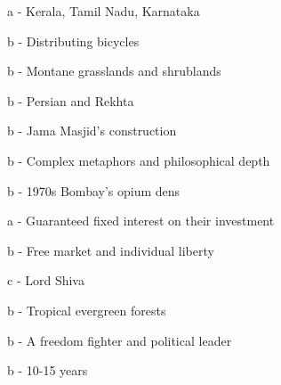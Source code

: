 \documentclass[12pt,a4paper]{book}
\begin{document}
\begin{enhancedmcq}[Question 2]{a - Kerala, Tamil Nadu, Karnataka}
\end{enhancedmcq}

\begin{enhancedmcq}[Question 3]{b - Distributing bicycles}
\end{enhancedmcq}

\begin{enhancedmcq}[Question 4]{b - Montane grasslands and shrublands}
\end{enhancedmcq}

\begin{enhancedmcq}[Question 5]{b - Persian and Rekhta}
\end{enhancedmcq}

\begin{enhancedmcq}[Question 6]{b - Jama Masjid's construction}
\end{enhancedmcq}

\begin{enhancedmcq}[Question 7]{b - Complex metaphors and philosophical depth}
\end{enhancedmcq}

\begin{enhancedmcq}[Question 8]{b - 1970s Bombay's opium dens}
\end{enhancedmcq}

\begin{enhancedmcq}[Question 9]{a - Guaranteed fixed interest on their investment}
\end{enhancedmcq}

\begin{enhancedmcq}[Question 10]{b - Free market and individual liberty}
\end{enhancedmcq}

\begin{enhancedmcq}[Question 11]{c - Lord Shiva}
\end{enhancedmcq}

\begin{enhancedmcq}[Question 12]{b - Tropical evergreen forests}
\end{enhancedmcq}

\begin{enhancedmcq}[Question 13]{b - A freedom fighter and political leader}
\end{enhancedmcq}

\begin{enhancedmcq}[Question 14]{b - 10-15 years}
\end{enhancedmcq}
\end{document}
